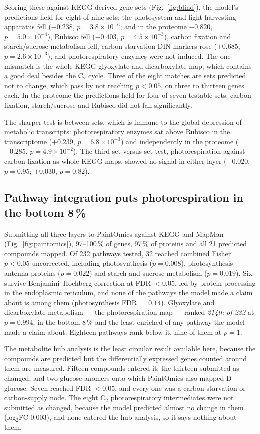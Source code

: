 \documentclass[pdflatex,sn-nature]{sn-jnl}
\begin{document}
Scoring these against KEGG-derived gene sets (Fig.~\ref{fig:blind}), the model's predictions
held for eight of nine sets: the photosystem and light-harvesting apparatus fell
($-0.238$, $p = 3.8\times10^{-6}$; and in the proteome $-0.820$, $p = 5.0\times10^{-4}$),
Rubisco fell ($-0.403$, $p = 4.5\times10^{-3}$), carbon fixation and starch/sucrose
metabolism fell, carbon-starvation DIN markers rose ($+0.685$, $p = 2.6\times10^{-3}$), and
photorespiratory enzymes were not induced. The one mismatch is the whole KEGG glyoxylate and
dicarboxylate map, which contains a good deal besides the C$_2$ cycle. Three of the eight
matches are sets predicted not to change, which pass by not reaching $p<0.05$, on three to
thirteen genes each. In the proteome the predictions held for four of seven testable sets:
carbon fixation, starch/sucrose and Rubisco did not fall significantly.

The sharper test is between sets, which is immune to the global depression of metabolic
transcripts: photorespiratory enzymes sat above Rubisco in the transcriptome
($+0.239$, $p = 6.8\times10^{-3}$) and independently in the proteome
($+0.285$, $p = 4.9\times10^{-2}$). The third set-versus-set test, photorespiration against
carbon fixation as whole KEGG maps, showed no signal in either layer ($-0.020$, $p = 0.95$;
$+0.030$, $p = 0.82$).

\subsection{Pathway integration puts photorespiration in the bottom 8\,\%}

Submitting all three layers to PaintOmics \citep{paintomics4} against KEGG and MapMan
(Fig.~\ref{fig:paintomics}), 97--100\,\% of genes, 97\,\% of proteins and all 21 predicted
compounds mapped. Of 232 pathways tested, 32 reached combined Fisher $p<0.05$ uncorrected,
including photosynthesis ($p = 0.008$), photosynthesis antenna proteins ($p = 0.022$) and
starch and sucrose metabolism ($p = 0.019$). Six survive Benjamini--Hochberg correction at
FDR $<0.05$, led by protein processing in the endoplasmic reticulum, and none of the pathways
the model made a claim about is among them (photosynthesis FDR $= 0.14$). Glyoxylate and dicarboxylate metabolism --- the
photorespiration map --- ranked \emph{214th of 232} at $p = 0.994$, in the bottom
8\,\% and the least enriched of any pathway the model made a claim about. Eighteen
pathways rank below it, nine of them at $p = 1$.

The metabolite hub analysis is the least circular result available here, because the
compounds are predicted but the differentially expressed genes counted around them are
measured. Fifteen compounds entered it: the thirteen submitted as changed, and two glucose
anomers onto which PaintOmics also mapped D-glucose. Seven reached FDR $<0.05$, and every one
was a carbon-starvation or carbon-supply node. The eight C$_2$ photorespiratory intermediates
were not submitted as changed, because the model predicted almost no change in them
(log$_2$FC $0.003$), and none entered the hub analysis, so it says nothing about them.
\end{document}
